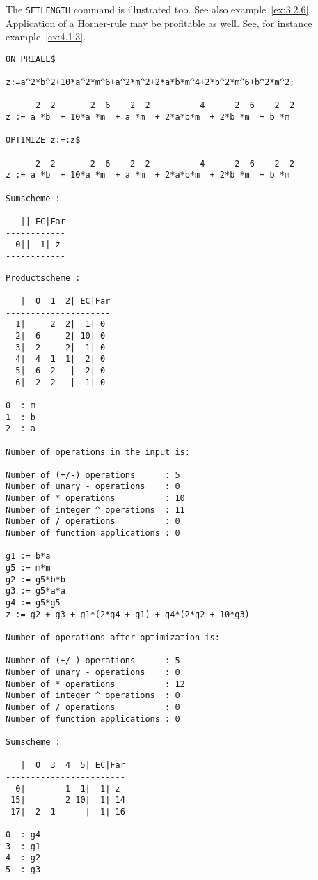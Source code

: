 The {\tt SETLENGTH} command is illustrated too. See also example~\ref{ex:3.2.6}.
Application of a Horner-rule may be profitable as well. See, for instance
example~\ref{ex:4.1.3}.
{\small
\begin{verbatim}
ON PRIALL$

z:=a^2*b^2+10*a^2*m^6+a^2*m^2+2*a*b*m^4+2*b^2*m^6+b^2*m^2;

      2  2       2  6    2  2          4      2  6    2  2
z := a *b  + 10*a *m  + a *m  + 2*a*b*m  + 2*b *m  + b *m

OPTIMIZE z:=:z$

      2  2       2  6    2  2          4      2  6    2  2
z := a *b  + 10*a *m  + a *m  + 2*a*b*m  + 2*b *m  + b *m

Sumscheme :

   || EC|Far
------------
  0||  1| z
------------
\end{verbatim}}
\newpage
{\small
\begin{verbatim}
Productscheme :

   |  0  1  2| EC|Far
---------------------
  1|     2  2|  1| 0
  2|  6     2| 10| 0
  3|  2     2|  1| 0
  4|  4  1  1|  2| 0
  5|  6  2   |  2| 0
  6|  2  2   |  1| 0
---------------------
0  : m
1  : b
2  : a

Number of operations in the input is:

Number of (+/-) operations      : 5
Number of unary - operations    : 0
Number of * operations          : 10
Number of integer ^ operations  : 11
Number of / operations          : 0
Number of function applications : 0

g1 := b*a
g5 := m*m
g2 := g5*b*b
g3 := g5*a*a
g4 := g5*g5
z := g2 + g3 + g1*(2*g4 + g1) + g4*(2*g2 + 10*g3)

Number of operations after optimization is:

Number of (+/-) operations      : 5
Number of unary - operations    : 0
Number of * operations          : 12
Number of integer ^ operations  : 0
Number of / operations          : 0
Number of function applications : 0

Sumscheme :

   |  0  3  4  5| EC|Far
------------------------
  0|        1  1|  1| z
 15|        2 10|  1| 14
 17|  2  1      |  1| 16
------------------------
0  : g4
3  : g1
4  : g2
5  : g3
\end{verbatim}}
\newpage
